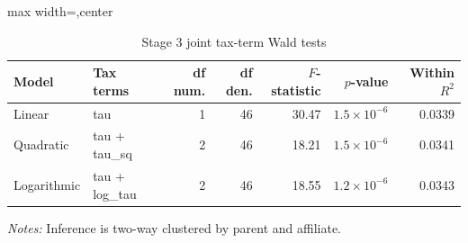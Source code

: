 \begin{table}[H]
\centering
\scriptsize
\caption{Stage 3 joint tax-term Wald tests}
\label{tab:app_stage3_wald_tests}
\begin{adjustbox}{max width=\textwidth,center}
\begin{tabular}{@{}llrrrrr@{}}
\toprule
Model & Tax terms & df num. & df den. & $F$-statistic & $p$-value & Within $R^2$ \\
\midrule
Linear & tau & 1 & 46 & 30.47 & $1.5 \times 10^{-6}$ & 0.0339 \\
Quadratic & tau + tau\_sq & 2 & 46 & 18.21 & $1.5 \times 10^{-6}$ & 0.0341 \\
Logarithmic & tau + log\_tau & 2 & 46 & 18.55 & $1.2 \times 10^{-6}$ & 0.0343 \\
\bottomrule
\end{tabular}
\end{adjustbox}

\vspace{0.5em}
\begin{minipage}{0.96\textwidth}
\footnotesize\raggedright \textit{Notes:} Inference is two-way clustered by parent and affiliate.
\end{minipage}
\end{table}
